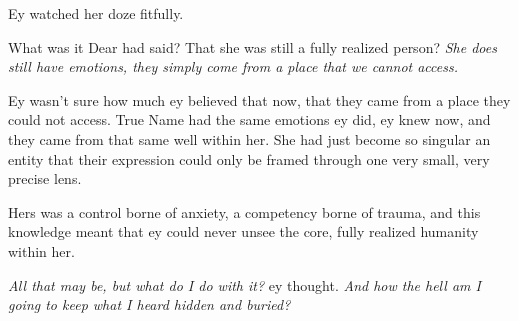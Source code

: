 Ey watched her doze fitfully.

What was it Dear had said? That she was still a fully realized person? \emph{She does still have emotions, they simply come from a place that we cannot access.}

Ey wasn't sure how much ey believed that now, that they came from a place they could not access. True Name had the same emotions ey did, ey knew now, and they came from that same well within her. She had just become so singular an entity that their expression could only be framed through one very small, very precise lens.

Hers was a control borne of anxiety, a competency borne of trauma, and this knowledge meant that ey could never unsee the core, fully realized humanity within her.

\emph{All that may be, but what do I do with it?} ey thought. \emph{And how the hell am I going to keep what I heard hidden and buried?}
